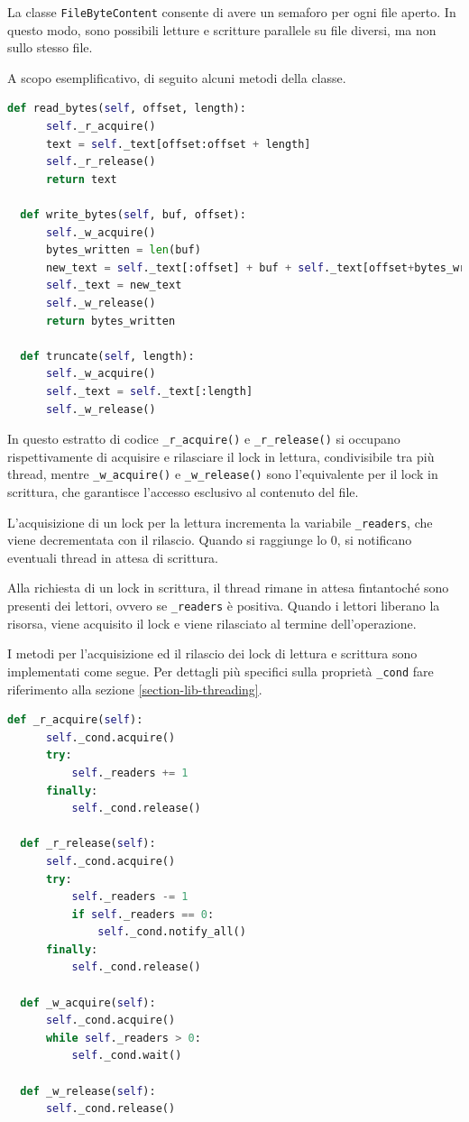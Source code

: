 \documentclass[a4paper,12pt,twoside,openright]{report}
\begin{document}
  La classe \texttt{FileByteContent} consente di avere un semaforo per ogni file aperto.
  In questo modo, sono possibili letture e scritture parallele su file diversi, ma non sullo stesso file.

  A scopo esemplificativo, di seguito alcuni metodi della classe.
  \begin{lstlisting}[language=Python]
  def read_bytes(self, offset, length):
      self._r_acquire()
      text = self._text[offset:offset + length]
      self._r_release()
      return text

  def write_bytes(self, buf, offset):
      self._w_acquire()
      bytes_written = len(buf)
      new_text = self._text[:offset] + buf + self._text[offset+bytes_written:]
      self._text = new_text
      self._w_release()
      return bytes_written

  def truncate(self, length):
      self._w_acquire()
      self._text = self._text[:length]
      self._w_release()
  \end{lstlisting}

  In questo estratto di codice \texttt{\_r\_acquire()} e \texttt{\_r\_release()} si occupano rispettivamente di acquisire e rilasciare
  il lock in lettura, condivisibile tra più thread, mentre \texttt{\_w\_acquire()} e \texttt{\_w\_release()}
  sono l'equivalente per il lock in scrittura, che garantisce l'accesso esclusivo al contenuto del file.

  L'acquisizione di un lock per la lettura incrementa la variabile \texttt{\_readers}, che viene 
  decrementata con il rilascio. Quando si raggiunge lo $0$, si notificano eventuali thread in attesa di scrittura.

  Alla richiesta di un lock in scrittura, il thread rimane in attesa fintantoché sono presenti
  dei lettori, ovvero se \texttt{\_readers} è positiva. Quando i lettori liberano la risorsa, viene acquisito
  il lock e viene rilasciato al termine dell'operazione.

  I metodi per l'acquisizione ed il rilascio dei lock di lettura e scrittura sono implementati
  come segue.
  Per dettagli più specifici sulla proprietà \texttt{\_cond} fare riferimento alla
  sezione \ref{section-lib-threading}.

  \begin{lstlisting}[language=Python]
  def _r_acquire(self):
      self._cond.acquire()
      try:
          self._readers += 1
      finally:
          self._cond.release()

  def _r_release(self):
      self._cond.acquire()
      try:
          self._readers -= 1
          if self._readers == 0:
              self._cond.notify_all()
      finally:
          self._cond.release()

  def _w_acquire(self):
      self._cond.acquire()
      while self._readers > 0:
          self._cond.wait()

  def _w_release(self):
      self._cond.release()
  \end{lstlisting}
\end{document}
